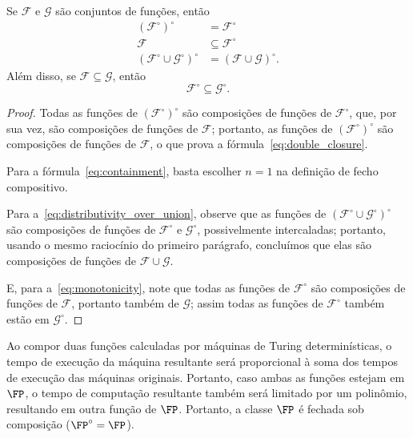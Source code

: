 \begin{proposition}
    Se $\mathcal F$ e $\mathcal G$ são conjuntos de funções, então
    \begin{align}
        (\mathcal F^\circ)^\circ &= \mathcal F^\circ
        \label{eq:double_closure} \\
        \mathcal F &\subseteq \mathcal F^\circ
        \label{eq:containment} \\
        (\mathcal F^\circ \cup \mathcal G^\circ)^\circ &=
            (\mathcal F \cup \mathcal G)^\circ.
        \label{eq:distributivity_over_union}
    \end{align}
    Além disso, se $\mathcal F \subseteq \mathcal G$,
    então
    \begin{equation}
        \mathcal F^\circ \subseteq \mathcal G^\circ.
        \label{eq:monotonicity}
    \end{equation}
    \label{thm:compositive_closure_properties}
\end{proposition}

\begin{proof}
    Todas as funções de $(\mathcal F^\circ)^\circ$
    são composições de funções de $\mathcal F^\circ$,
    que, por sua vez,
    são composições de funções de $\mathcal F$;
    portanto, as funções de $(\mathcal F^\circ)^\circ$
    são composições de funções de $\mathcal F$,
    o que prova a fórmula~\ref{eq:double_closure}.

    Para a fórmula~\ref{eq:containment},
    basta escolher $n = 1$ na definição de fecho compositivo.

    Para a~\ref{eq:distributivity_over_union},
    observe que as funções de $(\mathcal F^\circ \cup \mathcal G^\circ)^\circ$
    são composições de funções de $\mathcal F^\circ$ e $\mathcal G^\circ$,
    possivelmente intercaladas;
    portanto, usando o mesmo raciocínio do primeiro parágrafo,
    concluímos que elas são composições de funções de
    $\mathcal F \cup \mathcal G$.

    E, para a~\ref{eq:monotonicity},
    note que todas as funções de $\mathcal F^\circ$
    são composições de funções de $\mathcal F$,
    portanto também de $\mathcal G$;
    assim todas as funções de $\mathcal F^\circ$
    também estão em $\mathcal G^\circ$.
\end{proof}

Ao compor duas funções calculadas por máquinas de Turing determinísticas,
o tempo de execução da máquina resultante
será proporcional à soma dos tempos de execução das máquinas originais.
Portanto,
caso ambas as funções estejam em $\FP$,
o tempo de computação resultante também será limitado por um polinômio,
resultando em outra função de $\FP$.
Portanto,
a classe $\FP$ é fechada sob composição
($\FP^\circ = \FP$).

